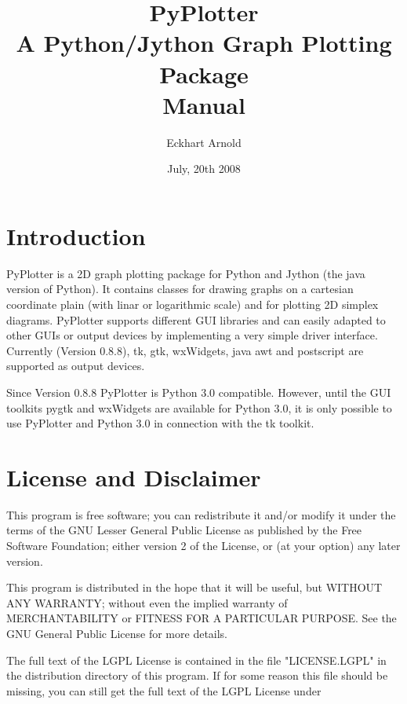 \documentclass[12pt,a4paper,USenglish]{article}
\begin{document}
\title{PyPlotter\\A Python/Jython Graph Plotting Package\\Manual}
\author{Eckhart Arnold}
\date{July, 20th 2008}

\maketitle

\tableofcontents{}


\section{Introduction}

{\sf PyPlotter} is a 2D graph plotting package for Python and Jython
(the java version of Python). It contains classes for drawing graphs
on a cartesian coordinate plain (with linar or logarithmic scale) and
for plotting 2D simplex diagrams. {\sf PyPlotter} supports different
GUI libraries and can easily adapted to other GUIs or output devices
by implementing a very simple driver interface. Currently (Version
0.8.8), tk, gtk, wxWidgets, java awt and postscript are supported as
output devices.

Since Version 0.8.8 PyPlotter is Python 3.0 compatible. However, until 
the GUI toolkits pygtk and wxWidgets are available for Python 3.0, it is
only possible to use PyPlotter and Python 3.0 in connection with the tk 
toolkit.

\section{License and Disclaimer}

This program is free software; you can redistribute it and/or
modify it under the terms of the GNU Lesser General Public
License as published by the Free Software Foundation; either
version 2 of the License, or (at your option) any later version.

This program is distributed in the hope that it will be useful,
but WITHOUT ANY WARRANTY; without even the implied warranty of
MERCHANTABILITY or FITNESS FOR A PARTICULAR PURPOSE.  See the GNU
General Public License for more details.

The full text of the LGPL License is contained in the file 
"LICENSE.LGPL" in the distribution directory of this program. 
If for some reason this file should be missing, you can still get 
the full text of the LGPL License under 
\end{document}
